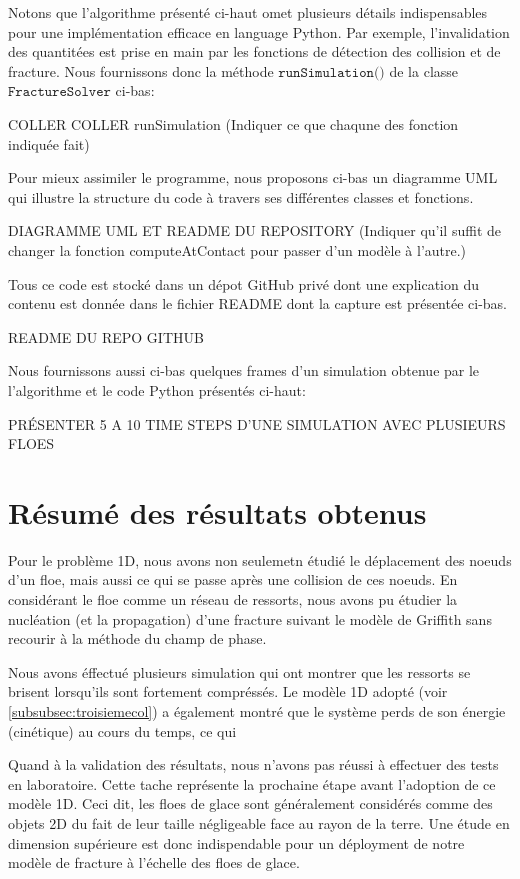 Notons que l'algorithme présenté ci-haut omet plusieurs détails indispensables pour une implémentation efficace en language Python. Par exemple, l'invalidation des quantitées est prise en main par les fonctions de détection des collision et de fracture. Nous fournissons donc la méthode $\texttt{runSimulation()}$ de la classe $\texttt{FractureSolver}$ ci-bas:

COLLER COLLER runSimulation (Indiquer ce que chaqune des fonction indiquée fait)

Pour mieux assimiler le programme, nous proposons ci-bas un diagramme UML qui illustre la structure du code à travers ses différentes classes et fonctions.

DIAGRAMME UML ET README DU REPOSITORY (Indiquer qu'il suffit de changer la fonction computeAtContact pour passer d'un modèle à l'autre.)

Tous ce code est stocké dans un dépot GitHub privé dont une explication du contenu est donnée dans le fichier README dont la capture est présentée ci-bas. 

README DU REPO GITHUB


Nous fournissons aussi ci-bas quelques frames d'un simulation obtenue par le l'algorithme et le code Python présentés ci-haut:

PRÉSENTER 5 A 10 TIME STEPS D'UNE SIMULATION AVEC PLUSIEURS FLOES



\section{Résumé des résultats obtenus}


Pour le problème 1D, nous avons non seulemetn étudié le déplacement des noeuds d'un floe, mais aussi ce qui se passe après une collision de ces noeuds. En considérant le floe comme un réseau de ressorts, nous avons pu étudier la nucléation (et la propagation) d'une fracture suivant le modèle de Griffith sans recourir à la méthode du champ de phase.

Nous avons éffectué plusieurs simulation qui ont montrer que les ressorts se brisent lorsqu'ils sont fortement compréssés. Le modèle 1D adopté (voir \cref{subsubsec:troisiemecol}) a également montré que le système perds de son énergie (cinétique) au cours du temps, ce qui 


Quand à la validation des résultats, nous n'avons pas réussi à effectuer des tests en laboratoire. Cette tache représente la prochaine étape avant l'adoption de ce modèle 1D. Ceci dit, les floes de glace sont généralement considérés comme des objets 2D du fait de leur taille négligeable face au rayon de la terre. Une étude en dimension supérieure est donc indispendable pour un déployment de notre modèle de fracture à l'échelle des floes de glace.











